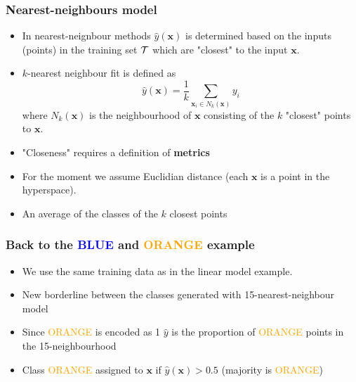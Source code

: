 \documentclass[notes]{beamer}          %
\newcommand{\vect}[1]{\bm{#1}}
\begin{document}
\begin{frame}
\frametitle{Nearest-neighbours model}
    \begin{itemize}
        \item In nearest-neignbour methods $\hat{y}(\vect{x})$ is determined based on the inputs (points) in the training set $\cal{T}$ which are "closest" to the input $\vect{x}$.
        \item $k$-nearest neighbour fit is defined as
        $$ \hat{y}(\vect{x}) = \frac{1}{k} \sum_{\vect{x}_i \in N_k(\vect{x})} y_i $$
        where $N_k(\vect{x})$ is the neighbourhood of $\vect{x}$ consisting of the $k$ "closest" points to $\vect{x}$.
        \item "Closeness" requires a definition of {\bf metrics}
        \item For the moment we assume Euclidian distance (each $\vect{x}$ is a point in the hyperspace).
        \item An average of the classes of the $k$ closest points
    \end{itemize}
\end{frame}

\begin{frame}
\frametitle{Back to the \textcolor{blue}{BLUE} and \textcolor{orange}{ORANGE} example}
    \begin{itemize}
        \item We use the same training data as in the linear model example.
        \item New borderline between the classes generated with 15-nearest-neighbour model
        \item Since \textcolor{orange}{ORANGE} is encoded as 1 $\hat{y}$ is the proportion of \textcolor{orange}{ORANGE} points in the 15-neighbourhood
        \item Class \textcolor{orange}{ORANGE} assigned to $\vect{x}$ if $\hat{y}(\vect{x}) > 0.5$ (majority is \textcolor{orange}{ORANGE})
    \end{itemize}
\end{frame}
\end{document}
